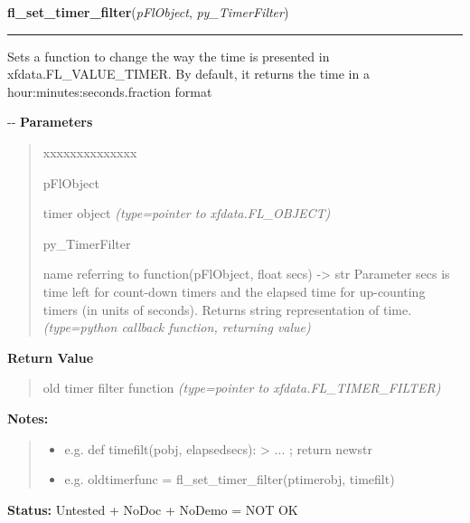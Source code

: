 \hspace{.8\funcindent}\begin{boxedminipage}{\funcwidth}

    \raggedright \textbf{fl\_set\_timer\_filter}(\textit{pFlObject}, \textit{py\_TimerFilter})

    \vspace{-1.5ex}

    \rule{\textwidth}{0.5\fboxrule}
\setlength{\parskip}{2ex}

Sets a function to change the way the time is presented in
xfdata.FL\_VALUE\_TIMER. By default, it returns the time in a
hour:minutes:seconds.fraction format

-{}-
\setlength{\parskip}{1ex}
      \textbf{Parameters}
      \vspace{-1ex}

      \begin{quote}
        \begin{Ventry}{xxxxxxxxxxxxxx}

          \item[pFlObject]


timer object
            {\it (type=pointer to xfdata.FL\_OBJECT)}

          \item[py\_TimerFilter]


name referring to function(pFlObject, float secs) -> str
Parameter secs is time left for count-down timers and the elapsed
time for up-counting timers (in units of seconds). Returns string
representation of time.
            {\it (type=python callback function, returning value)}

        \end{Ventry}

      \end{quote}

      \textbf{Return Value}
    \vspace{-1ex}

      \begin{quote}

old timer filter function
      {\it (type=pointer to xfdata.FL\_TIMER\_FILTER)}

      \end{quote}

\textbf{Notes:}
\begin{quote}
  \begin{itemize}

  \item
    \setlength{\parskip}{0.6ex}

e.g. def timefilt(pobj, elapsedsecs): > ... ; return newstr


  \item 
e.g. oldtimerfunc = fl\_set\_timer\_filter(ptimerobj, timefilt)


\end{itemize}

\end{quote}

\textbf{Status:} 
Untested + NoDoc + NoDemo = NOT OK


    \end{boxedminipage}

